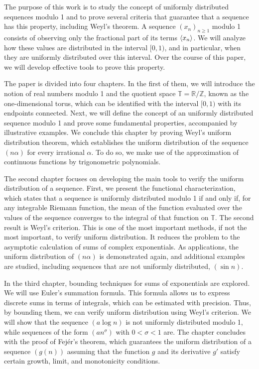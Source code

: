 
The purpose of this work is to study the concept of uniformly distributed sequences modulo 1 and to prove several criteria that guarantee that a sequence has this property, including Weyl's theorem. A sequence $(x_n)_{n\geq1}$ modulo 1 consists of observing only the fractional part of its terms $\langle x_n \rangle$. We will analyze how these values are distributed in the interval $[0,1)$, and in particular, when they are uniformly distributed over this interval. Over the course of this paper, we will develop effective tools to prove this property.

The paper is divided into four chapters. In the first of them, we will introduce the notion of real numbers modulo 1 and the quotient space $\mathbb{T}=\mathbb{R}/\mathbb{Z}$, known as the one-dimensional torus, which can be identified with the interval $[0,1)$ with its endpoints connected. Next, we will define the concept of an uniformly distributed sequence modulo 1 and prove some fundamental properties, accompanied by illustrative examples. We conclude this chapter by proving Weyl's uniform distribution theorem, which establishes the uniform distribution of the sequence $(n\alpha)$ for every irrational $\alpha$. To do so, we make use of the approximation of continuous functions by trigonometric polynomials. 

The second chapter focuses on developing the main tools to verify the uniform distribution of a sequence. First, we present the functional characterization, which states that a sequence is uniformly distributed modulo 1 if and only if, for any integrable Riemann function, the mean of the function evaluated over the values of the sequence converges to the integral of that function on $\mathbb{T}$. The second result is Weyl's criterion. This is one of the most important methods, if not the most important, to verify uniform distribution. It reduces the problem to the asymptotic calculation of sums of complex exponentials. As applications, the uniform distribution of $(n\alpha)$ is demonstrated again, and additional examples are studied, including sequences that are not uniformly distributed, $(\sin n)$.

In the third chapter, bounding techniques for sums of exponentials are explored. We will use Euler's summation formula. This formula allows us to express discrete sums in terms of integrals, which can be estimated with precision. Thus, by bounding them, we can verify uniform distribution using Weyl's criterion. We will show that the sequence $(a\log n)$ is not uniformly distributed modulo 1, while sequences of the form $(an^\sigma)$ with $0<\sigma<1$ are. The chapter concludes with the proof of Fejér's theorem, which guarantees the uniform distribution of a sequence $(g(n))$ assuming that the function $g$ and its derivative $g'$ satisfy certain growth, limit, and monotonicity conditions.


